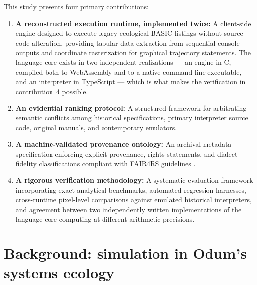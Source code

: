\documentclass[3p,times,authoryear,twocolumn]{elsarticle}
\begin{document}
This study presents four primary contributions:
\begin{enumerate}
\item \textbf{A reconstructed execution runtime, implemented twice:} A client-side engine designed to execute legacy ecological BASIC listings without source code alteration, providing tabular data extraction from sequential console outputs and coordinate rasterization for graphical trajectory statements. The language core exists in two independent realizations --- an engine in C, compiled both to WebAssembly and to a native command-line executable, and an interpreter in TypeScript --- which is what makes the verification in contribution~4 possible.
\item \textbf{An evidential ranking protocol:} A structured framework for arbitrating semantic conflicts among historical specifications, primary interpreter source code, original manuals, and contemporary emulators.
\item \textbf{A machine-validated provenance ontology:} An archival metadata specification enforcing explicit provenance, rights statements, and dialect fidelity classifications compliant with FAIR4RS guidelines \citep{barker2022}.
\item \textbf{A rigorous verification methodology:} A systematic evaluation framework incorporating exact analytical benchmarks, automated regression harnesses, cross-runtime pixel-level comparisons against emulated historical interpreters, and agreement between two independently written implementations of the language core computing at different arithmetic precisions.
\end{enumerate}

\section{Background: simulation in Odum's systems ecology}
\label{sec:background}
\end{document}
